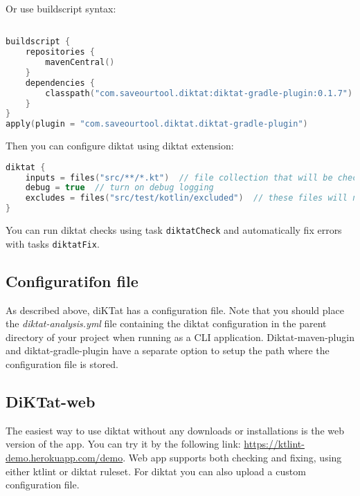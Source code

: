 Or use buildscript syntax:

\begin{lstlisting}[caption={DiKTat with Gradle plugin}, label={lst:gradle1}, language=Kotlin]

buildscript {
    repositories {
        mavenCentral()
    }
    dependencies {
        classpath("com.saveourtool.diktat:diktat-gradle-plugin:0.1.7")
    }
}
apply(plugin = "com.saveourtool.diktat.diktat-gradle-plugin")
\end{lstlisting}

Then you can configure diktat using diktat extension:

\begin{lstlisting}[caption={DiKTat extension}, label={lst:gradle2}, language=Kotlin]
diktat {
    inputs = files("src/**/*.kt")  // file collection that will be checked by diktat
    debug = true  // turn on debug logging
    excludes = files("src/test/kotlin/excluded")  // these files will not be checked by diktat
}
\end{lstlisting}

You can run diktat checks using task \texttt{diktatCheck} and automatically fix errors with tasks \texttt{diktatFix}.

\subsection{Configuratifon file}
As described above, diKTat has a configuration file. Note that you should place the \textsl{diktat-analysis.yml} file containing the diktat configuration in the parent directory of your project when running as a CLI application. Diktat-maven-plugin and diktat-gradle-plugin have a separate option to setup the path where the configuration file is stored.

\subsection{DiKTat-web}
The easiest way to use diktat without any downloads or installations is the web version of the app. You can try it by the following link: \url{https://ktlint-demo.herokuapp.com/demo}. Web app supports both checking and fixing, using either ktlint or diktat ruleset. For diktat you can also upload a custom configuration file.
